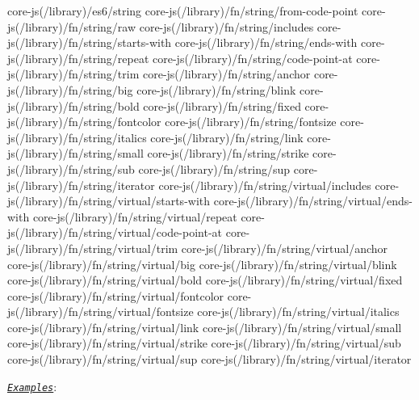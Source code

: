 \begin{DoxyCode}
core-js(/library)/es6/string
core-js(/library)/fn/string/from-code-point
core-js(/library)/fn/string/raw
core-js(/library)/fn/string/includes
core-js(/library)/fn/string/starts-with
core-js(/library)/fn/string/ends-with
core-js(/library)/fn/string/repeat
core-js(/library)/fn/string/code-point-at
core-js(/library)/fn/string/trim
core-js(/library)/fn/string/anchor
core-js(/library)/fn/string/big
core-js(/library)/fn/string/blink
core-js(/library)/fn/string/bold
core-js(/library)/fn/string/fixed
core-js(/library)/fn/string/fontcolor
core-js(/library)/fn/string/fontsize
core-js(/library)/fn/string/italics
core-js(/library)/fn/string/link
core-js(/library)/fn/string/small
core-js(/library)/fn/string/strike
core-js(/library)/fn/string/sub
core-js(/library)/fn/string/sup
core-js(/library)/fn/string/iterator
core-js(/library)/fn/string/virtual/includes
core-js(/library)/fn/string/virtual/starts-with
core-js(/library)/fn/string/virtual/ends-with
core-js(/library)/fn/string/virtual/repeat
core-js(/library)/fn/string/virtual/code-point-at
core-js(/library)/fn/string/virtual/trim
core-js(/library)/fn/string/virtual/anchor
core-js(/library)/fn/string/virtual/big
core-js(/library)/fn/string/virtual/blink
core-js(/library)/fn/string/virtual/bold
core-js(/library)/fn/string/virtual/fixed
core-js(/library)/fn/string/virtual/fontcolor
core-js(/library)/fn/string/virtual/fontsize
core-js(/library)/fn/string/virtual/italics
core-js(/library)/fn/string/virtual/link
core-js(/library)/fn/string/virtual/small
core-js(/library)/fn/string/virtual/strike
core-js(/library)/fn/string/virtual/sub
core-js(/library)/fn/string/virtual/sup
core-js(/library)/fn/string/virtual/iterator
\end{DoxyCode}
 \href{http://goo.gl/3UaQ93}{\tt {\itshape Examples}}\+: 
